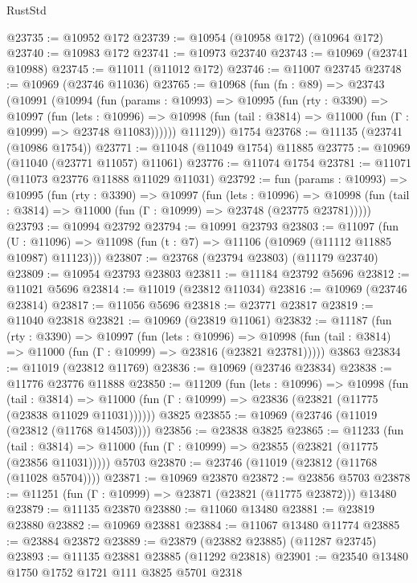 \begin{lexlean}{RustStd}
\begin{coremodule}
@23735 := @10952 @172
@23739 := @10954 (@10958 @172) (@10964 @172)
@23740 := @10983 @172
@23741 := @10973 @23740
@23743 := @10969 (@23741 @10988)
@23745 := @11011 (@11012 @172)
@23746 := @11007 @23745
@23748 := @10969 (@23746 @11036)
@23765 := @10968
    (fun (fn : @89) =>
    @23743
      (@10991
        (@10994
          (fun (params : @10993) =>
          @10995
            (fun (rty : @3390) =>
            @10997
              (fun (lets : @10996) =>
              @10998 (fun (tail : @3814) => @11000 (fun (Γ : @10999) => @23748 @11083))))))
        @11129))
    @1754
@23768 := @11135 (@23741 (@10986 @1754))
@23771 := @11048 (@11049 @1754) @11885
@23775 := @10969 (@11040 (@23771 @11057) @11061)
@23776 := @11074 @1754
@23781 := @11071 (@11073 @23776 @11888 @11029 @11031)
@23792 := fun (params : @10993) =>
  @10995
    (fun (rty : @3390) =>
    @10997
      (fun (lets : @10996) =>
      @10998 (fun (tail : @3814) => @11000 (fun (Γ : @10999) => @23748 (@23775 @23781)))))
@23793 := @10994 @23792
@23794 := @10991 @23793
@23803 := @11097
    (fun (U : @11096) => @11098 (fun (t : @7) => @11106 (@10969 (@11112 @11885 @10987) @11123)))
@23807 := @23768 (@23794 @23803) (@11179 @23740)
@23809 := @10954 @23793 @23803
@23811 := @11184 @23792 @5696
@23812 := @11021 @5696
@23814 := @11019 (@23812 @11034)
@23816 := @10969 (@23746 @23814)
@23817 := @11056 @5696
@23818 := @23771 @23817
@23819 := @11040 @23818
@23821 := @10969 (@23819 @11061)
@23832 := @11187
    (fun (rty : @3390) =>
    @10997
      (fun (lets : @10996) =>
      @10998 (fun (tail : @3814) => @11000 (fun (Γ : @10999) => @23816 (@23821 @23781)))))
    @3863
@23834 := @11019 (@23812 @11769)
@23836 := @10969 (@23746 @23834)
@23838 := @11776 @23776 @11888
@23850 := @11209
    (fun (lets : @10996) =>
    @10998
      (fun (tail : @3814) =>
      @11000 (fun (Γ : @10999) => @23836 (@23821 (@11775 (@23838 @11029 @11031))))))
    @3825
@23855 := @10969 (@23746 (@11019 (@23812 (@11768 @14503))))
@23856 := @23838 @3825
@23865 := @11233
    (fun (tail : @3814) => @11000 (fun (Γ : @10999) => @23855 (@23821 (@11775 (@23856 @11031)))))
    @5703
@23870 := @23746 (@11019 (@23812 (@11768 (@11028 @5704))))
@23871 := @10969 @23870
@23872 := @23856 @5703
@23878 := @11251 (fun (Γ : @10999) => @23871 (@23821 (@11775 @23872))) @13480
@23879 := @11135 @23870
@23880 := @11060 @13480
@23881 := @23819 @23880
@23882 := @10969 @23881
@23884 := @11067 @13480 @11774
@23885 := @23884 @23872
@23889 := @23879 (@23882 @23885) (@11287 @23745)
@23893 := @11135 @23881 @23885 (@11292 @23818)
@23901 := @23540 @13480 @1750 @1752 @1721 @111 @3825 @5701 @2318

\end{coremodule}
\end{lexlean}

